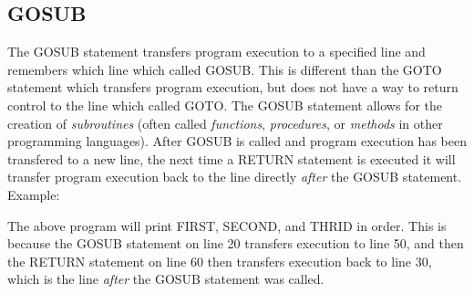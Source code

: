 

\subsection{GOSUB}

The {\ttfamily GOSUB} statement transfers program execution to a specified line
and remembers which line which called {\ttfamily GOSUB}.  This is different
than the {\ttfamily GOTO} statement which transfers program execution, but does
not have a way to return control to the line which called {\ttfamily GOTO}.
The {\ttfamily GOSUB} statement allows for the creation of {\em subroutines}
(often called {\em functions}, {\em procedures}, or {\em methods} in other
programming languages).  After {\ttfamily GOSUB} is called and program
execution has been transfered to a new line, the next time a {\ttfamily RETURN}
statement is executed it will transfer program execution back to the line
directly {\em after} the {\ttfamily GOSUB} statement.\\

Example:\\


The above program will print {\ttfamily FIRST}, {\ttfamily SECOND}, and
{\ttfamily THRID} in order.  This is because the {\ttfamily GOSUB} statement on
line 20 transfers execution to line 50, and then the {\ttfamily RETURN}
statement on line 60 then transfers execution back to line 30, which is the
line {\em after} the {\ttfamily GOSUB} statement was called.\\


